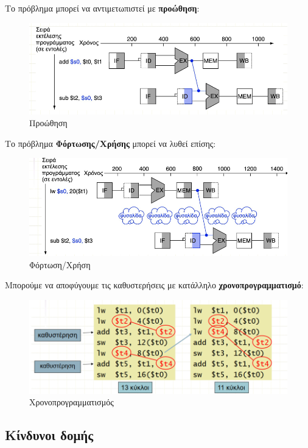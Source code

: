 \documentclass[11pt, oneside]{article}   	%
\begin{document}
Το πρόβλημα μπορεί να αντιμετωπιστεί με \textbf{προώθηση}:\\
\begin{figure}[h!]
	\centering
	\includegraphics[width=0.7\linewidth]{"Computer Architecture 2/screenshot002"}
	\caption{Προώθηση}
	\label{fig:screenshot002}
\end{figure}

Το πρόβλημα \textbf{Φόρτωσης/Χρήσης} μπορεί να λυθεί επίσης:\\

\begin{figure}[h!]
	\centering
	\includegraphics[width=0.7\linewidth]{"Computer Architecture 2/screenshot003"}
	\caption{Φόρτωση/Χρήση}
	\label{fig:screenshot003}
\end{figure}

\newpage
Μπορούμε να αποφύγουμε τις καθυστερήσεις με κατάλληλο \textbf{χρονοπρογραμματισμό}:\\

\begin{figure}[h!]
	\centering
	\includegraphics[width=0.7\linewidth]{"Computer Architecture 2/screenshot004"}
	\caption{Χρονοπρογραμματισμός}
	\label{fig:screenshot004}
\end{figure}

\subsection{Κίνδυνοι δομής}
\end{document}
